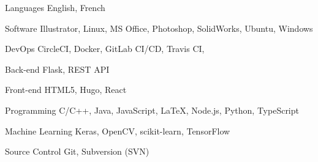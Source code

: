 \begin{cvskills}

\cvskill
{Languages}
{English, French}

\cvskill
{Software}
{
Illustrator,
Linux,
MS Office,
Photoshop,
SolidWorks,
Ubuntu,
Windows
}

\cvskill
{DevOps}
{
CircleCI,
Docker,
GitLab CI/CD,
Travis CI,
}

\cvskill
{Back-end}
{
Flask,
REST API
}

\cvskill
{Front-end}
{
HTML5,
Hugo,
React
}

\cvskill
{Programming}
{
C/C++,
Java,
JavaScript,
LaTeX,
Node.js,
Python,
TypeScript
}

\cvskill
{Machine Learning}
{
Keras,
OpenCV,
scikit-learn,
TensorFlow
}

\cvskill
{Source Control}
{
Git,
Subversion (SVN)
}

\end{cvskills}
